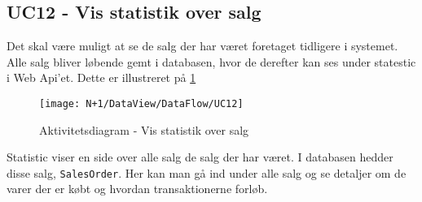 \subsection{UC12 - Vis statistik over salg}
Det skal være muligt at se de salg der har været foretaget tidligere i systemet. Alle salg bliver løbende gemt i databasen, hvor de derefter kan ses under statestic i Web Api'et. Dette er illustreret på \ref{fig:AD_UC12}

\begin{figure}[H]
    \centering
    \texttt{[image: N+1/DataView/DataFlow/UC12]}
    \caption{Aktivitetsdiagram - Vis statistik over salg}
    \label{fig:AD_UC12}
\end{figure} 

Statistic viser en side over alle salg de salg der har været. I databasen hedder disse salg, \texttt{SalesOrder}. Her kan man gå ind under alle salg og se detaljer om de varer der er købt og hvordan transaktionerne forløb. 